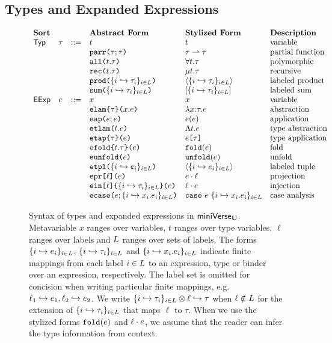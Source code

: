 \subsection{Types and Expanded Expressions}

\begin{figure}
$\begin{array}{lllllll}
\textbf{Sort} & & & \textbf{Abstract Form} & \textbf{Stylized Form} & \textbf{Description}\\
\mathsf{Typ} & \tau & ::= & t & t & \text{variable}\\
&&& \texttt{parr}\texttt{(}\tau; \tau\texttt{)} & \tau \rightharpoonup \tau & \text{partial function}\\
&&& \texttt{all}\texttt{(}t.\tau\texttt{)} & \forall t.\tau & \text{polymorphic}\\
&&& \texttt{rec}\texttt{(}t.\tau\texttt{)} & \mu t.\tau & \text{recursive}\\
&&& \texttt{prod}\texttt{(}\{i \hookrightarrow \tau_{i}\}_{i \in L}\texttt{)} & \langle \{i \hookrightarrow \tau_{i}\}_{i \in L} \rangle & \text{labeled product}\\
&&& \texttt{sum}\texttt{(}\{i \hookrightarrow \tau_{i}\}_{i \in L}\texttt{)} & [\{i \hookrightarrow \tau_{i}\}_{i \in L}] & \text{labeled sum}\\
\mathsf{EExp} & e & ::= & x & x & \text{variable}\\
&&& \texttt{elam}\texttt{\{}\tau\texttt{\}(}x.e\texttt{)} & \lambda x{:}\tau.e & \text{abstraction}\\
&&& \texttt{eap}\texttt{(}e; e\texttt{)} & e(e) & \text{application}\\
&&& \texttt{etlam}\texttt{(}t.e\texttt{)} & \Lambda t.e & \text{type abstraction}\\
&&& \texttt{etap}\texttt{\{}\tau\texttt{\}(}e\texttt{)} & e\texttt{[}\tau\texttt{]} & \text{type application}\\
&&& \texttt{efold}\texttt{\{}t.\tau\texttt{\}(}e\texttt{)} & \texttt{fold}(e) & \text{fold}\\
&&& \texttt{eunfold}\texttt{(}e\texttt{)} & \texttt{unfold}(e) & \text{unfold}\\
&&& \texttt{etpl}\texttt{(}\{i \hookrightarrow e_{i}\}_{i \in L}\texttt{)} & \langle \{i \hookrightarrow e_{i}\}_{i \in L}\rangle & \text{labeled tuple}\\
&&& \texttt{epr}\texttt{[}\ell\texttt{](}e\texttt{)} & e \cdot \ell & \text{projection}\\
&&& \texttt{ein}\texttt{[}\ell\texttt{]\{}\{i \hookrightarrow \tau_{i}\}_{i \in L}\texttt{\}(}e\texttt{)} & \ell \cdot e & \text{injection}\\
&&& \texttt{ecase}\texttt{(}e; \{i \hookrightarrow x_{i}.e_{i}\}_{i \in L}\texttt{)} & \texttt{case}~e~\{i \hookrightarrow x_{i}.e_{i}\}_{i \in L} & \text{case analysis}
\end{array}$
\caption[Syntax of types and expanded expressions in $\miniVerseU$.]{Syntax of types and expanded expressions in $\miniVerseU$. Metavariable $x$ ranges over variables, $t$ ranges over type variables, $\ell$ ranges over labels and $L$ ranges over sets of labels. The forms $\{i \hookrightarrow e_{i}\}_{i \in L}$, $\{i \hookrightarrow \tau_{i}\}_{i \in L}$ and $\{i \hookrightarrow x_{i}.e_{i}\}_{i \in L}$ indicate finite mappings from each label $i \in L$ to an expression, type or binder over an expression, respectively. The label set is omitted for concision when writing particular finite mappings, e.g. $\ell_1 \hookrightarrow e_1, \ell_2 \hookrightarrow e_2$. We write $\{i \hookrightarrow \tau_{i}\}_{i \in L} \otimes \ell \hookrightarrow \tau$ when $\ell \notin L$ for the extension of $\{i \hookrightarrow \tau_{i}\}_{i \in L}$ that maps $\ell$ to $\tau$. When we use the stylized forms $\texttt{fold}(e)$ and $\ell \cdot e$, we assume that the reader can infer the type information from context. }

\end{figure}
